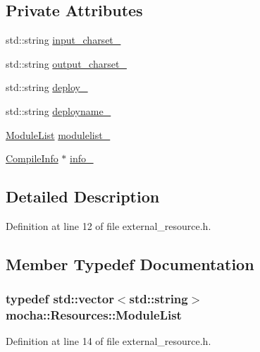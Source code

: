 \subsection*{Private Attributes}
\begin{DoxyCompactItemize}
\item 
std::string \hyperlink{classmocha_1_1_resources_aed6e763a953593244d82f1d8719cdd42}{input\_\-charset\_\-}
\item 
std::string \hyperlink{classmocha_1_1_resources_ab885bf85cea539a88e3470d641a2bbfb}{output\_\-charset\_\-}
\item 
std::string \hyperlink{classmocha_1_1_resources_a5b9cdb960e936a221c887b3dbc769d15}{deploy\_\-}
\item 
std::string \hyperlink{classmocha_1_1_resources_a69f915315820cbdf43de4897d960b9b9}{deployname\_\-}
\item 
\hyperlink{classmocha_1_1_resources_aad639c8977988cfb76e0f7bd52a01f12}{ModuleList} \hyperlink{classmocha_1_1_resources_af41a0c56b5d657ad8d98e0a70a030038}{modulelist\_\-}
\item 
\hyperlink{classmocha_1_1_compile_info}{CompileInfo} $\ast$ \hyperlink{classmocha_1_1_resources_ab4cadf1432623cb6965096a467d5c88d}{info\_\-}
\end{DoxyCompactItemize}


\subsection{Detailed Description}


Definition at line 12 of file external\_\-resource.h.



\subsection{Member Typedef Documentation}
\hypertarget{classmocha_1_1_resources_aad639c8977988cfb76e0f7bd52a01f12}{
\subsubsection[{ModuleList}]{\setlength{\rightskip}{0pt plus 5cm}typedef std::vector$<$std::string$>$ {\bf mocha::Resources::ModuleList}}}
\label{classmocha_1_1_resources_aad639c8977988cfb76e0f7bd52a01f12}


Definition at line 14 of file external\_\-resource.h.



